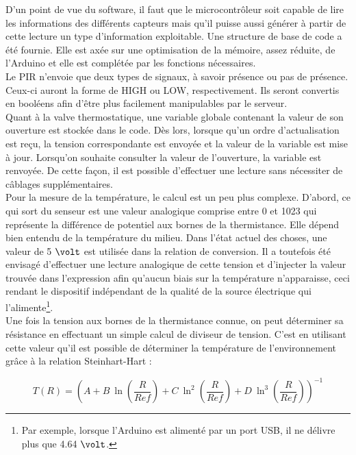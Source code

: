 \documentclass[11pt,a4paper,11pt]{report}
\begin{document}
D’un point de vue du software, il faut que le microcontrôleur soit capable de lire les informations des différents capteurs mais qu’il puisse aussi générer à partir de cette lecture un type d'information exploitable. Une structure de base de code a été fournie. Elle est axée sur une optimisation de la mémoire, assez réduite, de l’Arduino et elle est complétée par les fonctions nécessaires.\\ 

Le PIR n’envoie que deux types de signaux, à savoir présence ou pas de présence. Ceux-ci auront la forme de HIGH ou LOW, respectivement. Ils seront convertis en booléens afin d'être plus facilement manipulables par le serveur.\\

Quant à la valve thermostatique, une variable globale contenant la valeur de son ouverture est stockée dans le code. Dès lors, lorsque qu'un ordre d'actualisation est reçu, la tension correspondante est envoyée et la valeur de la variable est mise à jour. Lorsqu'on souhaite consulter la valeur de l'ouverture, la variable est renvoyée. De cette façon, il est possible d'effectuer une lecture sans nécessiter de câblages supplémentaires.\\

Pour la mesure de la température, le calcul est un peu plus complexe. D’abord, ce qui sort du senseur est une valeur analogique comprise entre 0 et 1023 qui représente la différence de potentiel aux bornes de la thermistance. Elle dépend bien entendu de la température du milieu. Dans l'état actuel des choses, une valeur de 5 $\volt$ est utilisée dans la relation de conversion. Il a toutefois été envisagé d'effectuer une lecture analogique de cette tension et d'injecter la valeur trouvée dans l'expression afin qu'aucun biais sur la température n'apparaisse, ceci rendant le dispositif indépendant de la qualité de la source électrique qui l'alimente\footnote{Par exemple, lorsque l'Arduino est alimenté par un port USB, il ne délivre plus que 4.64 $\volt$.}. \\

Une fois la tension aux bornes de la thermistance connue, on peut déterminer sa résistance en effectuant un simple calcul de diviseur de tension. C’est en utilisant cette valeur qu'il est possible de déterminer la température de l’environnement grâce à la relation Steinhart-Hart\cite{datash} :

\begin{equation}
\label{steinhart}
 T(R) = (A+B ~\ln (\frac{R}{Ref}) + C ~\ln^{2}(\frac{R}{Ref}) + D~\ln^{3}(\frac{R}{Ref}))^{-1}
\end{equation}
\end{document}
